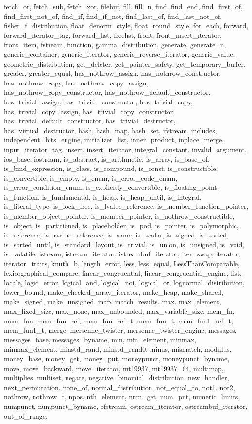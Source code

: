 {{fetch\_or, fetch\_sub, fetch\_xor, filebuf, fill, fill\_n, find, find\_end, find\_first\_of, find\_first\_not\_of, find\_if, find\_if\_not, find\_last\_of, find\_last\_not\_of, fisher\_f\_distribution, float\_denorm\_style, float\_round\_style, for\_each, forward, forward\_iterator\_tag, forward\_list, freelist, front, front\_insert\_iterator, front\_item, fstream, function, gamma\_distribution, generate, generate\_n, generic\_container, generic\_iterator, generic\_reverse\_iterator, generic\_value, geometric\_distribution, get\_deleter, get\_pointer\_safety, get\_temporary\_buffer, greater, greater\_equal, has\_nothrow\_assign, has\_nothrow\_constructor, has\_nothrow\_copy, has\_nothrow\_copy\_assign, has\_nothrow\_copy\_constructor, has\_nothrow\_default\_constructor, has\_trivial\_assign, has\_trivial\_constructor, has\_trivial\_copy, has\_trivial\_copy\_assign, has\_trivial\_copy\_constructor, has\_trivial\_default\_constructor, has\_trivial\_destructor, has\_virtual\_destructor, hash, hash\_map, hash\_set, ifstream, includes, independent\_bits\_engine, initializer\_list, inner\_product, inplace\_merge, input\_iterator\_tag, insert, insert\_iterator, integral\_constant, invalid\_argument, ios\_base, iostream, is\_abstract, is\_arithmetic, is\_array, is\_base\_of, is\_bind\_expression, is\_class, is\_compound, is\_const, is\_constructible, is\_convertible, is\_empty, is\_enum, is\_error\_code\_enum, is\_error\_condition\_enum, is\_explicitly\_convertible, is\_floating\_point, is\_function, is\_fundamental, is\_heap, is\_heap\_until, is\_integral, is\_literal\_type, is\_lock\_free, is\_lvalue\_reference, is\_member\_function\_pointer, is\_member\_object\_pointer, is\_member\_pointer, is\_nothrow\_constructible, is\_object, is\_partitioned, is\_placeholder, is\_pod, is\_pointer, is\_polymorphic, is\_reference, is\_rvalue\_reference, is\_same, is\_scalar, is\_signed, is\_sorted, is\_sorted\_until, is\_standard\_layout, is\_trivial, is\_union, is\_unsigned, is\_void, is\_volatile, istream, istream\_iterator, istreambuf\_iterator, iter\_swap, iterator, iterator\_traits, knuth\_b, length\_error, less, less\_equal, LessThanComparable, lexicographical\_compare, linear\_congruential, linear\_congruential\_engine, list, locale, logic\_error, logical\_and, logical\_not, logical\_or, lognormal\_distribution, lower\_bound, make\_checked\_array\_iterator, make\_heap, make\_shared, make\_signed, make\_unsigned, map, match\_results, max, max\_element, max\_fixed\_size, max\_none, max\_unbounded, max\_variable\_size, mem\_fn, mem\_fun, mem\_fun\_ref, mem\_fun\_ref\_t, mem\_fun\_t, mem\_fun1\_ref\_t, mem\_fun1\_t, merge, mersenne\_twister, mersenne\_twister\_engine, messages, messages\_base, messages\_byname, min, min\_element, minmax, minmax\_element, minstd\_rand, minstd\_rand0, minus, mismatch, modulus, money\_base, money\_get, money\_put, moneypunct, moneypunct\_byname, move, move\_backward, move\_iterator, mt19937, mt19937\_64, multimap, multiplies, multiset, negate, negative\_binomial\_distribution, new\_handler, next\_permutation, none\_of, normal\_distribution, not\_equal\_to, not1, not2, nothrow, nothrow\_t, npos, nth\_element, num\_get, num\_put, numeric\_limits, numpunct, numpunct\_byname, ofstream, ostream\_iterator, ostreambuf\_iterator, out\_of\_range, }}

